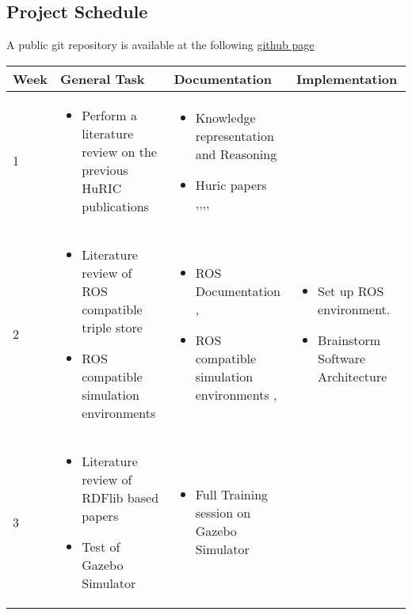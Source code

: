 \subsection{Project Schedule}
A public git repository is available at the following \href{https://github.com/GiovanniBalestrieri/JinchiMiru}{github page}
\small
\noindent 
\begin{center}
    \begin{tabular}{ | l | p{4cm} | p{4cm} | p{5cm} |}
    \hline
    Week & General Task & Documentation & Implementation \\ \hline
    1 &  \begin{itemize} 
    \item Perform a literature review on the previous HuRIC
     publications
     \end{itemize} & 
	\begin{itemize}
     \item  Knowledge representation and Reasoning \cite{bib11}
     \item  Huric papers
      \cite{bib1},\cite{bib2},\cite{bib3},\cite{bib4}, \cite{bib5}
	\end{itemize} & \\ \hline
    2 & \begin{itemize}
     \item Literature review of ROS compatible triple store
     \item ROS compatible simulation environments
	\end{itemize}     
     & \begin{itemize}
     \item ROS Documentation \cite{bib6}, \cite{bib7}
     \item ROS compatible simulation environments \cite{bib8}, \cite{bib9}
	\end{itemize}   & 
	\begin{itemize} 
	\item Set up ROS environment.
	\item Brainstorm Software Architecture
	\end{itemize}\\ \hline
    3 & \begin{itemize}
     \item Literature review of RDFlib based papers
     \item Test of Gazebo Simulator
     \end{itemize}  & 
     \begin{itemize}
     \item Full Training session on Gazebo Simulator \cite{bib10} 

\end{itemize}
\end{tabular}
\end{center}
